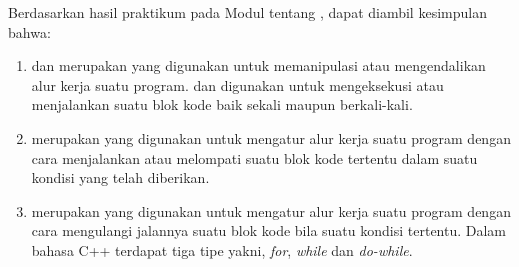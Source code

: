 \documentclass[../main.tex]{subfiles}
\begin{document}
    \ilz{}Berdasarkan hasil praktikum pada Modul {\thechapter} tentang {\leftmark}, dapat diambil kesimpulan bahwa:
    \begin{enumerate}
        \item {
            {\Statement} {\control} dan {\looping} merupakan {\statement} yang digunakan untuk memanipulasi atau mengendalikan alur kerja suatu program. {\Statement} {\control} dan {\looping} digunakan untuk mengeksekusi atau menjalankan suatu blok kode baik sekali maupun berkali-kali.
        }
        \item {
            {\Statement} {\control} merupakan {\statement} yang digunakan untuk mengatur alur kerja suatu program dengan cara menjalankan atau melompati suatu blok kode tertentu dalam suatu kondisi yang telah diberikan.
        }
        \item {
            {\Statement} {\looping} merupakan {\statement} yang digunakan untuk mengatur alur kerja suatu program dengan cara mengulangi jalannya suatu blok kode bila suatu kondisi tertentu. Dalam bahasa C++ terdapat tiga tipe {\statement} {\looping} yakni, \textit{for}, \textit{while} dan \textit{do-while}.
        }
    \end{enumerate}
\end{document}
